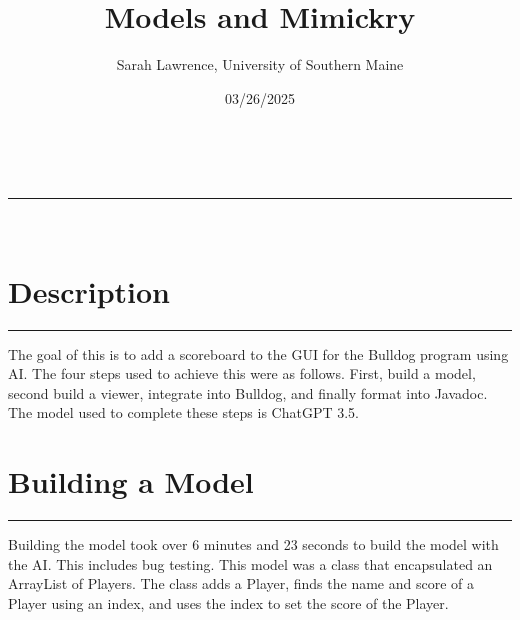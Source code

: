 \documentclass[a4paper,11pt]{article}
\makeatletter
\newcommand{\linia}{\rule{\linewidth}{0.5pt}}
\renewcommand{\maketitle}{
\begin{center}
\vspace{2ex}
{\huge \textsc{\@title}}
\vspace{1ex}
\\
\linia\\
\@author \hfill \@date
\vspace{4ex}
\end{center}
}
\makeatother
\begin{document}
\title{Models and Mimickry}

\author{Sarah Lawrence, University of Southern Maine}

\date{03/26/2025}

\maketitle

\section*{Description}
\hrule
\vspace{13pt} %
The goal of this is to add a scoreboard to the GUI for the Bulldog program using AI. The four steps used to achieve this were as follows. First, build a model, second build a viewer, integrate into Bulldog, and finally format into Javadoc. The model used to complete these steps is ChatGPT 3.5. 

\section*{Building a Model}
\hrule
\vspace{10pt} %
Building the model took over 6 minutes and 23 seconds to build the model with the AI. This includes bug testing. This model was a class that encapsulated an ArrayList of Players. The class adds a Player, finds the name and score of a Player using an index, and uses the index to set the score of the Player.
\vspace{5pt} %
\end{document}
